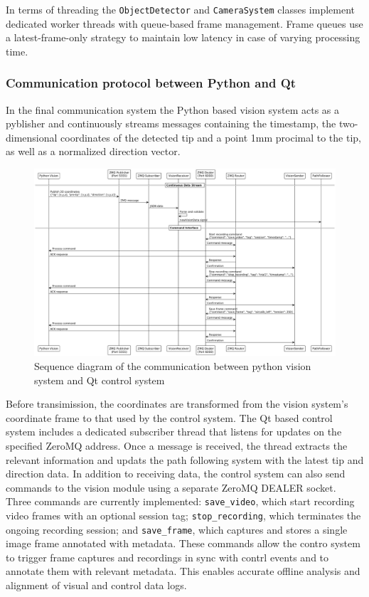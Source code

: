 In terms of threading the \texttt{ObjectDetector} and \texttt{CameraSystem} classes implement dedicated worker threads with queue-based frame management. Frame queues use a latest-frame-only strategy to maintain low latency in case of varying processing time.



\subsubsection{Communication protocol between Python and Qt}
In the final communication system the Python based vision system acts as a pyblisher and continuously streams messages containing the timestamp, the two-dimensional coordinates of the detected tip and a point 1mm procimal to the tip, as well as a normalized direction vector. 
\begin{figure} [H]
    \centering
    \includegraphics[width=1.1\linewidth]{images/Software documentation/visionSequencediag.png}
    \caption{Sequence diagram of the communication between python vision system and Qt control system}
    \label{fig:seqComm}
\end{figure}
Before transimission, the coordinates are transformed from the vision system's coordinate frame to that used by the control system. The Qt based control system includes a dedicated subscriber thread that listens for updates on the specified ZeroMQ address. Once a message is received, the thread extracts the relevant information and updats the path following system with the latest tip and direction data. 
\newline \newline
In addition to receiving data, the control system can also send commands to the vision module using a separate ZeroMQ DEALER socket. Three commands are currently implemented: \texttt{save\_video}, which start recording video frames with an optional session tag; \texttt{stop\_recording}, which terminates the ongoing recording session; and \texttt{save\_frame}, which captures and stores a single image frame annotated with metadata. These commands allow the contro system to trigger frame captures and recordings in sync with contrl events and to annotate them with relevant metadata. This enables accurate offline analysis and alignment of visual and control data logs.



